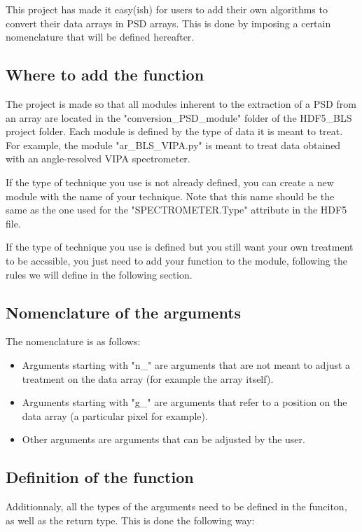 \documentclass[a4paper,12pt]{article}
\begin{document}
This project has made it easy(ish) for users to add their own algorithms to convert their data arrays in PSD arrays. This is done by imposing a certain nomenclature  that will be defined hereafter.

\subsection{Where to add the function}

The project is made so that all modules inherent to the extraction of a PSD from an array are located in the "conversion\_PSD\_module" folder of the HDF5\_BLS project folder. Each module is defined by the type of data it is meant to treat. For example, the module "ar\_BLS\_VIPA.py" is meant to treat data obtained with an angle-resolved VIPA spectrometer. 

If the type of technique you use is not already defined, you can create a new module with the name of your technique. Note that this name should be the same as the one used for the "SPECTROMETER.Type" attribute in the HDF5 file.

If the type of technique you use is defined but you still want your own treatment to be accssible, you just need to add your function to the module, following the rules we will define in the following section.

\subsection{Nomenclature of the arguments }

The nomenclature is as follows:
\begin{itemize}
    \item Arguments starting with "n\_" are arguments that are not meant to adjust a treatment on the data array (for example the array itself).
    \item Arguments starting with "g\_" are arguments that refer to a position on the data array (a particular pixel for example).
    \item Other arguments are arguments that can be adjusted by the user.
\end{itemize}

\subsection{Definition of the function}

Additionnaly, all the types of the arguments need to be defined in the funciton, as well as the return type. This is done the following way:
\end{document}
